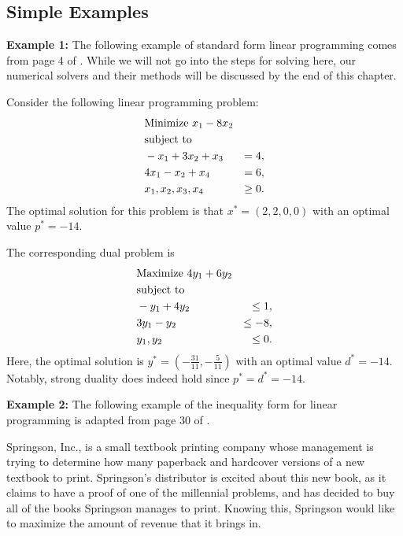	\subsection{Simple Examples}
	
	\textbf{Example 1:}
	The following example of standard form linear programming comes from page 4 of \cite{BlekhermanGrigoriy;ParriloPabloA.;Thomas2013}. While we will not go into the steps for solving here, our numerical solvers and their methods will be discussed by the end of this chapter. 
	
	Consider the following linear programming problem: 
	\begin{equation} \label{lp primal simple example 1}
		\begin{aligned}
			&\textnormal{Minimize } x_1 - 8x_2 \\
			&\textnormal{subject to} \\
			&-x_1 + 3x_2 + x_3 &= 4, \\
			&4x_1 - x_2 + x_4 &= 6, \\
			&x_1, x_2, x_3, x_4 &\geq 0.
		\end{aligned}
	\end{equation}
	The optimal solution for this problem is that $x^* = (2, 2, 0, 0)$ with an optimal value $p^* = -14$. 
	
	The corresponding dual problem is
	\begin{equation} \label{lp dual simple example 1}
		\begin{aligned}
			&\textnormal{Maximize } 4y_1 + 6y_2\\
			&\textnormal{subject to} \\
			&-y_1 + 4y_2 &\leq 1, \\
			&3y_1 - y_2 &\leq -8, \\
			&y_1, y_2 &\leq 0.
		\end{aligned}
	\end{equation}
	Here, the optimal solution is $y^* = (-\frac{31}{11}, -\frac{5}{11})$ with an optimal value $d^* = -14$. Notably, strong duality does indeed hold since $p^* = d^* = -14$.
	
	\textbf{Example 2:} The following example of the inequality form for linear programming is adapted from page 30 of \cite{ManagementScience}.
	
	Springson, Inc., is a small textbook printing company whose management is trying to determine how many paperback and hardcover versions of a new textbook to print. Springson's distributor is excited about this new book, as it claims to have a proof of one of the millennial problems, and has decided to buy all of the books Springson manages to print. Knowing this, Springson would like to maximize the amount of revenue that it brings in. 
	
